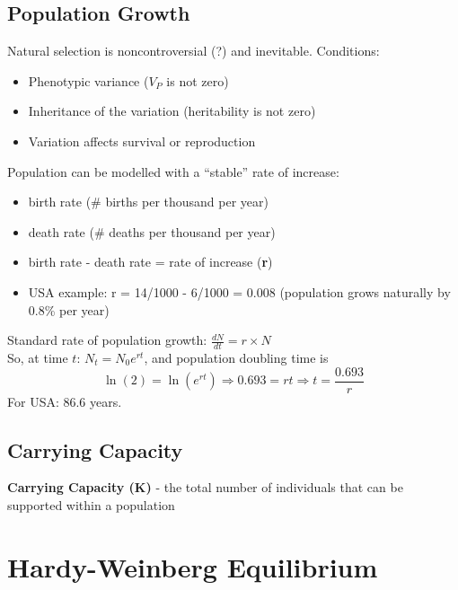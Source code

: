 \documentclass{scrartcl}
\begin{document}
\subsection{Population Growth}
\label{sec:5-5}
Natural selection is noncontroversial (?) and inevitable. Conditions:
\begin{itemize}
\item Phenotypic variance ($V_P$ is not zero)
\item Inheritance of the variation (heritability is not zero)
\item Variation affects survival or reproduction
\end{itemize}
Population can be modelled with a ``stable'' rate of increase:
\begin{itemize}
\item birth rate (\# births per thousand per year)
\item death rate (\# deaths per thousand per year)
\item birth rate - death rate = rate of increase ({\bf r})
\item USA example: r = 14/1000 - 6/1000 = 0.008 (population grows naturally by 0.8\% per year)
\end{itemize}
Standard rate of population growth: $\frac{dN}{dt} = r \times N$ \\
So, at time $t$: $N_t = N_0 e^{rt}$, and population doubling time is
$$\ln(2) = \ln(e^{rt}) \Rightarrow 0.693 = rt \Rightarrow t = \frac{0.693}r$$
For USA: 86.6 years.
\subsection{Carrying Capacity}
\label{sec:5-6}

{\bf Carrying Capacity (K)} - the total number of individuals that can be supported within a population

\section{Hardy-Weinberg Equilibrium}
\label{sec:06-1}
\end{document}
